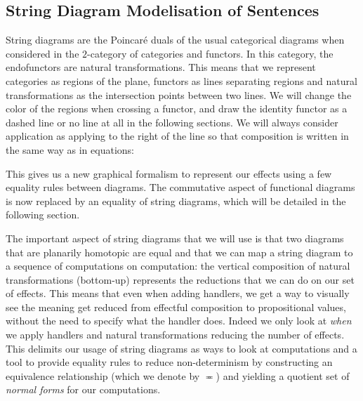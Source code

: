 \documentclass[math, english, info]{cours}
\begin{document}
\subsection{String Diagram Modelisation of Sentences}
\label{subsec:sd}
String diagrams are the Poincaré duals of the usual categorical diagrams when considered in the $2$-category of categories and functors.
In this category, the endofunctors are natural transformations.
This means that we represent categories as regions of the plane, functors as lines separating regions and natural transformations as the intersection points between two lines.
We will change the color of the regions when crossing a functor, and draw the identity functor as a dashed line or no line at all in the following sections.
We will always consider application as applying to the right of the line so that composition is written in the same way as in equations:
\begin{center}
	\end{center}
This gives us a new graphical formalism to represent our effects using a few equality rules between diagrams.
The commutative aspect of functional diagrams is now replaced by an equality of string diagrams, which will be detailed in the following section.

The important aspect of string diagrams that we will use is that two diagrams that are planarily homotopic are equal \cite{delpeuchNormalizationPlanarString2022} and that we can map a string diagram to a sequence of computations on computation: the vertical composition of natural transformations (bottom-up) represents the reductions that we can do on our set of effects.
This means that even when adding handlers, we get a way to visually see the meaning get reduced from effectful composition to propositional values, without the need to specify what the handler does.
Indeed we only look at \emph{when} we apply handlers and natural transformations reducing the number of effects.
This delimits our usage of string diagrams as ways to look at computations and a tool to provide equality rules to reduce non-determinism by constructing an equivalence relationship (which we denote by $\eqcirc$) and yielding a quotient set of \emph{normal forms} for our computations.
\end{document}
